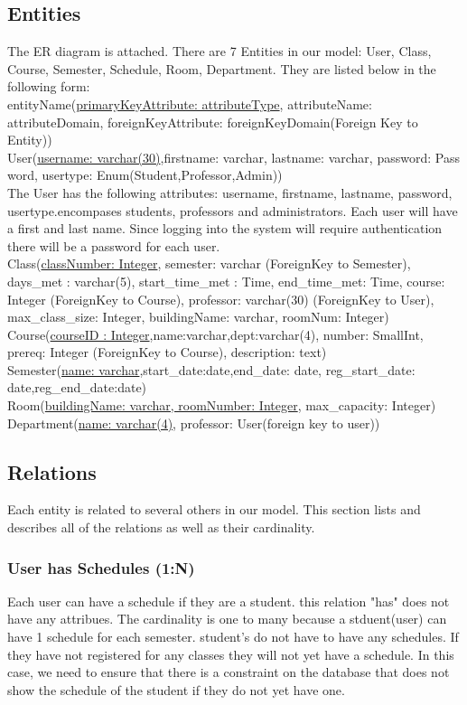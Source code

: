 \documentclass[11pt,oneside,a4paper]{article}
\begin{document}
\subsection{Entities}
The ER diagram is attached. There are 7 Entities in our model: User, Class, Course, Semester, Schedule, Room, Department.  They are listed below in the following form:
\\
entityName(\underline{primaryKeyAttribute: attributeType}, attributeName: attributeDomain, foreignKeyAttribute: foreignKeyDomain(Foreign Key to Entity))
\\
User(\underline{username: varchar(30)},firstname: varchar, lastname: varchar,
password: Pass	word, usertype: Enum(Student,Professor,Admin))
\\
The User has the following attributes: username, firstname, lastname, 
password, usertype.encompases students, professors and administrators.  
Each user will have a first and last name. Since logging into the system 
will require authentication there will be a password for each user.
\\
Class(\underline{classNumber: Integer}, semester: varchar (ForeignKey to
Semester), days\_met : varchar(5), start\_time\_met : Time, end\_time\_met:
Time, course: Integer (ForeignKey to Course), professor: varchar(30)
(ForeignKey to User), max\_class\_size: Integer, buildingName: varchar,
roomNum: Integer)
\\
Course(\underline{courseID	: Integer},name:varchar,dept:varchar(4), 
number: SmallInt, prereq: Integer (ForeignKey to Course), description: text)
\\
Semester(\underline{name: varchar},start\_date:date,end\_date: date, 
reg\_start\_date: date,reg\_end\_date:date)
\\
Room(\underline{buildingName: varchar, roomNumber: Integer}, max\_capacity:
Integer)\\
Department(\underline{name: varchar(4)}, professor: User(foreign key to user))
\subsection{Relations} 
Each entity is related to several others in our model.  This section lists and describes 
all of the relations as well as their cardinality. 
\\
\subsubsection{User has Schedules (1:N)}
Each user can have a schedule if they are a student.  this relation "has" does not have
 any attribues. The cardinality is one to many because a stduent(user) can have 1 
schedule for each semester. student's do not have to have any schedules.  If they have not
 registered for any classes they will not yet have a schedule.  In this case, we need to 
ensure that there is a constraint on the database that does not show the schedule of the 
student if they do not yet have one.  
\end{document}
